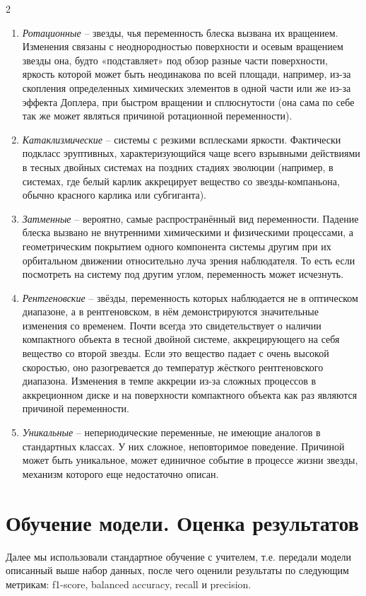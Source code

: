 \documentclass[11pt, a4paper]{article}
\begin{document}
\begin{multicols}{2}
\begin{enumerate}
    \item \textit{Ротационные} -- звезды, чья переменность блеска вызвана их вращением. Изменения связаны с неоднородностью поверхности и осевым вращением звезды она, будто «подставляет» под обзор разные части поверхности, яркость которой может быть неодинакова по всей площади, например, из-за скопления определенных химических элементов в одной части или же из-за эффекта Доплера, при быстром вращении и сплюснутости (она сама по себе так же может являться причиной ротационной переменности).
    
    \item \textit{Катаклизмические} – системы с резкими всплесками яркости. Фактически подкласс эруптивных, характеризующийся чаще всего взрывными действиями в тесных двойных системах на поздних стадиях эволюции (например, в системах, где белый карлик аккрецирует вещество со звезды-компаньона, обычно красного карлика или субгиганта). 
    
    \item \textit{Затменные} -- вероятно, самые распространённый вид переменности. Падение блеска вызвано не внутренними химическими и физическими процессами, а геометрическим покрытием одного компонента системы другим при их орбитальном движении относительно луча зрения наблюдателя. То есть если посмотреть на систему под другим углом, переменность может исчезнуть.
    
    \item \textit{Рентгеновские} -- звёзды, переменность которых наблюдается не в оптическом диапазоне, а в рентгеновском, в нём демонстрируются значительные изменения со временем. Почти всегда это свидетельствует о наличии компактного объекта в тесной двойной системе, аккрецирующего на себя вещество со второй звезды. Если это вещество падает с очень высокой скоростью, оно разогревается до температур жёсткого рентгеновского диапазона. Изменения в темпе аккреции из-за сложных процессов в аккреционном диске и на поверхности компактного объекта как раз являются причиной переменности.
    
    \item \textit{Уникальные} -- непериодические переменные, не имеющие аналогов в стандартных классах. У них сложное, неповторимое поведение. Причиной может быть уникальное, может единичное событие в процессе жизни звезды, механизм которого еще недостаточно описан.
    \end{enumerate}

    \section{Обучение модели. Оценка результатов}
    Далее мы использовали стандартное обучение с учителем, т.е. передали модели описанный выше набор данных, после чего оценили результаты по следующим метрикам: f1-score, balanced accuracy, recall и precision.


\end{multicols}
\end{document}
